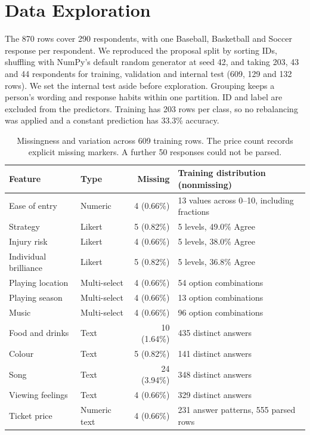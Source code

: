 \documentclass[12pt]{article}
\begin{document}
\section{Data Exploration}\label{sec:data-exploration}

The 870 rows cover 290 respondents, with one Baseball, Basketball and Soccer
response per respondent. We reproduced the proposal split by sorting IDs,
shuffling with NumPy's default random generator at seed 42, and taking 203, 43
and 44 respondents for training, validation and internal test (609, 129 and 132
rows). We set the internal test aside before exploration. Grouping keeps a
person's wording and response habits within one partition. ID and label are
excluded from the predictors. Training has 203 rows per class, so no
rebalancing was applied and a constant prediction has 33.3\% accuracy.

\begin{table}[h]
\centering
\small
\begin{tabular}{llrl}
\toprule
Feature & Type & Missing & Training distribution (nonmissing) \\
\midrule
Ease of entry         & Numeric      & 4 (0.66\%)  & 13 values across 0--10, including fractions \\
Strategy              & Likert       & 5 (0.82\%)  & 5 levels, 49.0\% Agree \\
Injury risk           & Likert       & 4 (0.66\%)  & 5 levels, 38.0\% Agree \\
Individual brilliance & Likert       & 5 (0.82\%)  & 5 levels, 36.8\% Agree \\
Playing location      & Multi-select & 4 (0.66\%)  & 54 option combinations \\
Playing season        & Multi-select & 4 (0.66\%)  & 13 option combinations \\
Music                 & Multi-select & 4 (0.66\%)  & 96 option combinations \\
Food and drinks       & Text         & 10 (1.64\%) & 435 distinct answers \\
Colour                & Text         & 5 (0.82\%)  & 141 distinct answers \\
Song                  & Text         & 24 (3.94\%) & 348 distinct answers \\
Viewing feelings      & Text         & 4 (0.66\%)  & 329 distinct answers \\
Ticket price          & Numeric text & 4 (0.66\%)  & 231 answer patterns, 555 parsed rows \\
\bottomrule
\end{tabular}
\caption{Missingness and variation across 609 training rows. The price count
records explicit missing markers. A further 50 responses could not be parsed.}
\label{tab:features}
\end{table}
\end{document}
